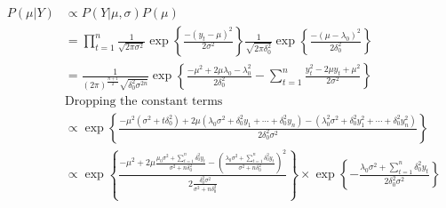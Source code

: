 \documentclass[12pt,a4paper,leqno]{report}
\theoremstyle{plain}
\theoremstyle{definition}
\theoremstyle{remark}
\begin{document}
\begin{align}\label{}
    P(\mu|Y) & \propto P(Y|\mu, \sigma)P(\mu)                                                                 \\
             & =
    \prod_{t=1}^{n}
    \frac{1}
    {{\sqrt {2\pi \sigma^2} }}
    \exp{
        \left \{
        \frac{-(y_t - \mu)^2}
        {2\sigma^2}
        \right \}
    }
    \frac{1}
    {{\sqrt {2\pi \delta_0^2} }}
    \exp{
        \left \{
        \frac{
            -(\mu - \lambda_0)^2
        }
        {2\delta_0^2}
        \right \}
    } \nonumber                                                                                               \\
             & =
    \frac{1}
    {
        (2\pi)^{\frac{n+1}{2}}
        \sqrt{ \delta_0^2 \sigma^{2n}}
    }
    \exp{
        \left \{
        \frac{- \mu^2 + 2 \mu \lambda_0 - \lambda_0^2}{2\delta_0^2}
        -
        \sum_{t=1}^{n}
        \frac{y_t^2 - 2 \mu y_t + \mu^2}{2\sigma^2}
        \right \}
    } \nonumber                                                                                               \\
             & \text{Dropping the constant terms} \nonumber                                                   \\
             & \propto
    \exp{
        \left \{
        \frac{
            -\mu^2 (\sigma^2 + t\delta_0^2)
            + 2 \mu (\lambda_0 \sigma^2 + \delta_0^2 y_1 + \cdots + \delta_0^2 y_n)
            - (\lambda_0^2 \sigma^2 + \delta_0^2 y_1^2 + \cdots + \delta_0^2 y_n^2)
        }
        {2\delta_0^2 \sigma^2}
        \right \}
    } \nonumber                                                                                               \\
             & \propto
    \exp{
        \left \{
        \frac{
            - \mu^2
            + 2 \mu \frac{\mu_0 \sigma^2 + \sum_{t=1}^{n} \delta_0^2 y_t}
            {\sigma^2 + n \delta_0^2}
            - \left(
            \frac{
                \lambda_0 \sigma^2 + \sum_{t=1}^{n} \delta_0^2 y_t
            }
            {\sigma^2 + n \delta_0^2}
            \right)^2
        }
        {
            2 \frac{\delta_0^2 \sigma^2}{\sigma^2 + n\delta_0^2}
        }
        \right \}
    }
    \times
    \exp{
        \left \{
        -\frac{
            \lambda_0 \sigma^2 + \sum_{t=1}^{n} \delta_0^2 y_t
        }
        {
            2 \delta_0^2 \sigma^2
        }
        \right \}
    } \nonumber                                                                                               \\

\end{align}
\end{document}
